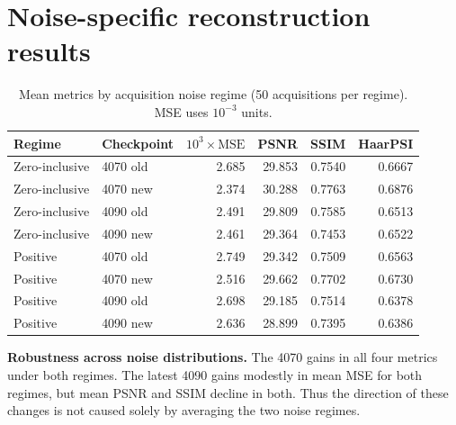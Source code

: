 \documentclass[11pt,a4paper]{article}
\newcommand{\mes}{\ensuremath{10^{3}\!\times\!\mathrm{MSE}}}
\begin{document}
\section{Noise-specific reconstruction results}
\begin{table}[ht]\centering\caption{Mean metrics by acquisition noise regime (50 acquisitions per regime). MSE uses $10^{-3}$ units.}\small
\begin{tabular}{llrrrr}\toprule Regime & Checkpoint & \mes & PSNR & SSIM & HaarPSI \\ \midrule
Zero-inclusive & 4070 old & 2.685 & 29.853 & 0.7540 & 0.6667 \\
Zero-inclusive & 4070 new & 2.374 & 30.288 & 0.7763 & 0.6876 \\
Zero-inclusive & 4090 old & 2.491 & 29.809 & 0.7585 & 0.6513 \\
Zero-inclusive & 4090 new & 2.461 & 29.364 & 0.7453 & 0.6522 \\
\midrule
Positive & 4070 old & 2.749 & 29.342 & 0.7509 & 0.6563 \\
Positive & 4070 new & 2.516 & 29.662 & 0.7702 & 0.6730 \\
Positive & 4090 old & 2.698 & 29.185 & 0.7514 & 0.6378 \\
Positive & 4090 new & 2.636 & 28.899 & 0.7395 & 0.6386 \\

\bottomrule\end{tabular}\end{table}
\textbf{Robustness across noise distributions.} The 4070 gains in all four metrics under both regimes. The latest 4090 gains modestly in mean MSE for both regimes, but mean PSNR and SSIM decline in both. Thus the direction of these changes is not caused solely by averaging the two noise regimes.
\end{document}

